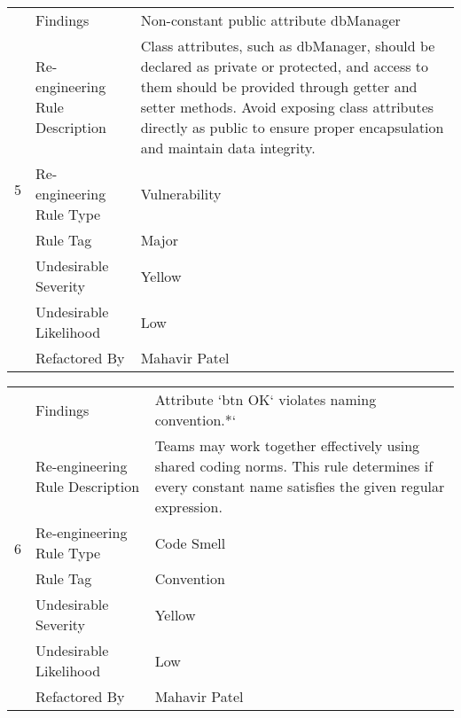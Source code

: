 \documentclass[12pt,english]{article}
\begin{document}
\begin{table}[!ht]
    \begin{tabularx}{\textwidth}{|c|l|X|}
    \hline
        \multirow{7}{*}{5} & Findings & Non-constant public attribute dbManager \\ \cline{2-3}
        & Re-engineering Rule Description & Class attributes, such as dbManager, should be declared as private or protected, and access to them should be provided through getter and setter methods. Avoid exposing class attributes directly as public to ensure proper encapsulation and maintain data integrity. \\ \cline{2-3}
        & Re-engineering Rule Type & Vulnerability \\ \cline{2-3}
        & Rule Tag & Major \\ \cline{2-3}
        & Undesirable Severity & Yellow \\ \cline{2-3}
        & Undesirable Likelihood & Low \\ \cline{2-3}
        & Refactored By & Mahavir Patel \\ \hline
    \end{tabularx}
\end{table}

\begin{table}[!ht]
    \begin{tabularx}{\textwidth}{|c|l|X|}
    \hline
        \multirow{7}{*}{6} & Findings & Attribute ‘btn OK‘ violates naming convention.*‘ \\ \cline{2-3}
        & Re-engineering Rule Description & Teams may work together effectively using shared coding norms. This rule determines if every constant name satisfies the given regular expression.
        \\ \cline{2-3}
        & Re-engineering Rule Type & Code Smell \\ \cline{2-3}
        & Rule Tag & Convention \\ \cline{2-3}
        & Undesirable Severity & Yellow \\ \cline{2-3}
        & Undesirable Likelihood & Low \\ \cline{2-3}
        & Refactored By  & Mahavir Patel \\ \hline
    \end{tabularx}
\end{table}
\end{document}

